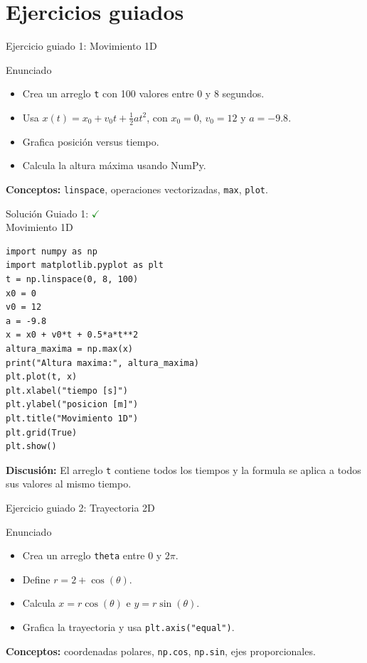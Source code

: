 \documentclass[10pt]{beamer}
\begin{document}
\section{Ejercicios guiados}
\begin{frame}{Ejercicio guiado 1: Movimiento 1D}
\begin{block}{Enunciado}
\begin{itemize}
  \item Crea un arreglo \texttt{t} con 100 valores entre 0 y 8 segundos.
  \item Usa \(x(t)=x_0+v_0t+\frac{1}{2}at^2\), con \(x_0=0\), \(v_0=12\) y \(a=-9.8\).
  \item Grafica posición versus tiempo.
  \item Calcula la altura máxima usando NumPy.
\end{itemize}
\end{block}
\textbf{Conceptos:} \texttt{linspace}, operaciones vectorizadas, \texttt{max}, \texttt{plot}.
\end{frame}

\begin{solutionblock}
\begin{frame}[fragile]{Solución Guiado 1: \hfill \textcolor{green}{$\checkmark$} \\ Movimiento 1D}
\begin{verbatim}
import numpy as np
import matplotlib.pyplot as plt
t = np.linspace(0, 8, 100)
x0 = 0
v0 = 12
a = -9.8
x = x0 + v0*t + 0.5*a*t**2
altura_maxima = np.max(x)
print("Altura maxima:", altura_maxima)
plt.plot(t, x)
plt.xlabel("tiempo [s]")
plt.ylabel("posicion [m]")
plt.title("Movimiento 1D")
plt.grid(True)
plt.show()
\end{verbatim}
\textbf{Discusión:} El arreglo \texttt{t} contiene todos los tiempos y la formula se aplica a todos sus valores al mismo tiempo.
\end{frame}
\end{solutionblock}

\begin{frame}{Ejercicio guiado 2: Trayectoria 2D}
\begin{block}{Enunciado}
\begin{itemize}
  \item Crea un arreglo \texttt{theta} entre 0 y \(2\pi\).
  \item Define \(r=2+\cos(\theta)\).
  \item Calcula \(x=r\cos(\theta)\) e \(y=r\sin(\theta)\).
  \item Grafica la trayectoria y usa \texttt{plt.axis("equal")}.
\end{itemize}
\end{block}
\textbf{Conceptos:} coordenadas polares, \texttt{np.cos}, \texttt{np.sin}, ejes proporcionales.
\end{frame}
\end{document}
